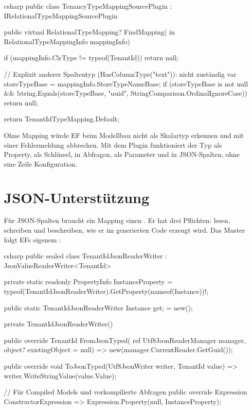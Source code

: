 \begin{sourcecode}{csharp}
public class TenancyTypeMappingSourcePlugin : IRelationalTypeMappingSourcePlugin
{
    public virtual RelationalTypeMapping? FindMapping(
        in RelationalTypeMappingInfo mappingInfo)
    {
        if (mappingInfo.ClrType != typeof(TenantId))
            return null;

        // Explizit anderer Spaltentyp (HasColumnType("text")): nicht zuständig
        var storeTypeBase = mappingInfo.StoreTypeNameBase;
        if (storeTypeBase is not null
            && !string.Equals(storeTypeBase, "uuid", StringComparison.OrdinalIgnoreCase))
            return null;

        return TenantIdTypeMapping.Default;
    }
}
\end{sourcecode}

\begin{note}
  Ohne Mapping würde EF  beim Modellbau nicht als Skalartyp
  erkennen und mit einer Fehlermeldung abbrechen. Mit dem Plugin funktioniert der Typ als
  Property, als Schlüssel, in Abfragen, als Parameter und in JSON-Spalten, ohne eine Zeile
  Konfiguration.
\end{note}

\section{JSON-Unterstützung}

Für JSON-Spalten braucht ein Mapping einen
. Er hat drei Pflichten:
lesen, schreiben und beschreiben, wie er im generierten Code erzeugt wird. Das Muster folgt
EFs eigenem :

\begin{sourcecode}{csharp}
public sealed class TenantIdJsonReaderWriter : JsonValueReaderWriter<TenantId>
{
    private static readonly PropertyInfo InstanceProperty =
        typeof(TenantIdJsonReaderWriter).GetProperty(nameof(Instance))!;

    public static TenantIdJsonReaderWriter Instance { get; } = new();

    private TenantIdJsonReaderWriter()
    {
    }

    public override TenantId FromJsonTyped(
        ref Utf8JsonReaderManager manager, object? existingObject = null)
        => new(manager.CurrentReader.GetGuid());

    public override void ToJsonTyped(Utf8JsonWriter writer, TenantId value)
        => writer.WriteStringValue(value.Value);

    // Für Compiled Models und vorkompilierte Abfragen
    public override Expression ConstructorExpression
        => Expression.Property(null, InstanceProperty);
}
\end{sourcecode}

